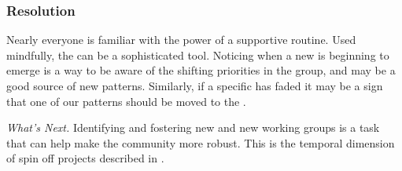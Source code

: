 \subsubsection*{Resolution} Nearly everyone is familiar with the power of a supportive routine.  Used mindfully, the  can be a sophisticated tool.  Noticing when a new  is beginning to emerge is a way to be aware of the shifting priorities in the group, and may be a good source of new patterns.  Similarly, if a specific  has faded it may be a sign that one of our patterns should be moved to the .

\begin{framed}
\emph{What's Next.}
Identifying and fostering new  and new working groups is a task that can help make the community more robust.  This is the temporal dimension of spin off projects described in .
\end{framed}


